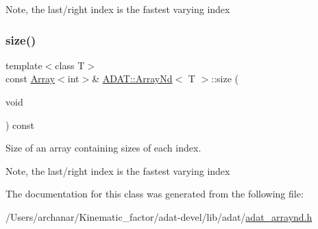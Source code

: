 Note, the last/right index is the fastest varying index \mbox{\label{classADAT_1_1ArrayNd_a81494e519c7c5fae6e7ef2e2b46ba24b}} 
\subsubsection{\texorpdfstring{size()}{size()}\hspace{0.1cm}{\footnotesize\ttfamily [6/6]}}
{\footnotesize\ttfamily template$<$class T$>$ \\
const \mbox{\hyperlink{classXMLArray_1_1Array}{Array}}$<$int$>$\& \mbox{\hyperlink{classADAT_1_1ArrayNd}{A\+D\+A\+T\+::\+Array\+Nd}}$<$ T $>$\+::size (\begin{DoxyParamCaption}\item[{void}]{ }\end{DoxyParamCaption}) const\hspace{0.3cm}{\ttfamily [inline]}}



Size of an array containing sizes of each index. 

Note, the last/right index is the fastest varying index 

The documentation for this class was generated from the following file\+:\begin{DoxyCompactItemize}
\item 
/\+Users/archanar/\+Kinematic\+\_\+factor/adat-\/devel/lib/adat/\mbox{\hyperlink{adat-devel_2lib_2adat_2adat__arraynd_8h}{adat\+\_\+arraynd.\+h}}\end{DoxyCompactItemize}
